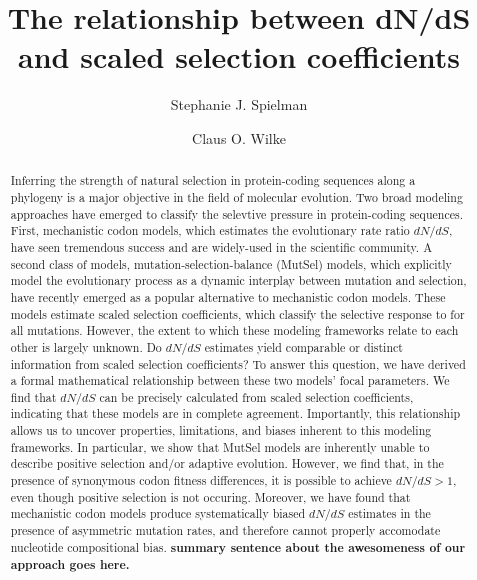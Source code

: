 \documentclass{pnastwo}
\begin{document}
	
	
\title{The relationship between dN/dS and scaled selection coefficients}

\author{Stephanie J. Spielman 
	\and
	Claus O. Wilke}


\maketitle
\begin{article}
	
\begin{abstract} %
Inferring the strength of natural selection in protein-coding sequences along a phylogeny is a major objective in the field of molecular evolution. Two broad modeling approaches have emerged to classify the selevtive pressure in protein-coding sequences. First, mechanistic codon models, which estimates the evolutionary rate ratio $dN/dS$, have seen tremendous success and are widely-used in the scientific community. A second class of models, mutation-selection-balance (MutSel) models, which explicitly model the evolutionary process as a dynamic interplay between mutation and selection, have recently emerged as a popular alternative to mechanistic codon models. These models estimate scaled selection coefficients, which classify the selective response to for all mutations. However, the extent to which these modeling frameworks relate to each other is largely unknown. Do $dN/dS$ estimates yield comparable or distinct information from scaled selection coefficients? To answer this question, we have derived a formal mathematical relationship between these two models' focal parameters. We find that $dN/dS$ can be precisely calculated from scaled selection coefficients, indicating that these models are in complete agreement. Importantly, this relationship allows us to uncover properties, limitations, and biases inherent to this modeling frameworks. In particular, we show that MutSel models are inherently unable to describe positive selection and/or adaptive evolution. However, we find that, in the presence of synonymous codon fitness differences, it is possible to achieve $dN/dS > 1$, even though positive selection is not occuring. Moreover, we have found that mechanistic codon models produce systematically biased $dN/dS$ estimates in the presence of asymmetric mutation rates, and therefore cannot properly accomodate nucleotide compositional bias. \textbf{summary sentence about the awesomeness of our approach goes here.}
\end{abstract}


\end{article}
\end{document}
